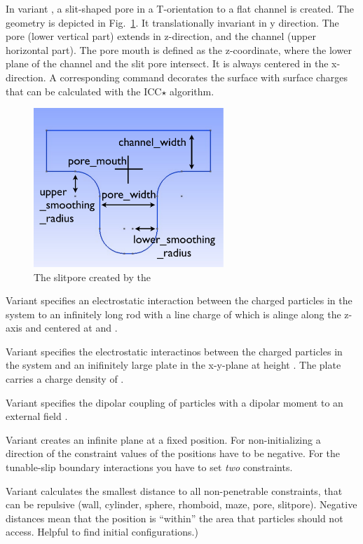 In variant , a slit-shaped pore in a T-orientation to a flat channel
is created. 
The geometry is depicted in Fig.~\ref{fig:slitpore}.
It translationally invariant in y direction.
The pore (lower vertical part) extends in z-direction, and the channel (upper
horizontal part). The pore mouth is defined as the z-coordinate, where the lower
plane of the channel and the slit pore intersect. It is always centered in the
x-direction. A corresponding  command decorates the surface
with surface charges that can be calculated with the ICC$\star$ algorithm.
\begin{figure}[ht]
  \label{fig:slitpore}
  \begin{center}
  \includegraphics[height=6cm]{figures/slitpore.pdf}
  \caption{The slitpore created by the }
  \end{center}
\end{figure}

Variant  specifies an electrostatic interaction between the
charged particles in the system to an infinitely long rod with a line
charge of  which is alinge along the z-axis and centered
at  and .

Variant  specifies the electrostatic interactinos between
the charged particles in the system and an inifinitely large plate in
the x-y-plane at height . The plate carries a charge density of
.
  
Variant  specifies the dipolar coupling of particles with a
dipolar moment to an external field   .

Variant  creates an infinite plane at a fixed position. For
non-initializing a direction of the constraint values of the positions
have to be negative. For the tunable-slip boundary interactions you
have to set \emph{two} constraints.

Variant  calculates the smallest distance to all non-penetrable
constraints, that can be repulsive (wall, cylinder, sphere, rhomboid, maze, pore, slitpore).
Negative distances mean that the position is ``within'' the area that
particles should not access. Helpful to find initial configurations.) 

